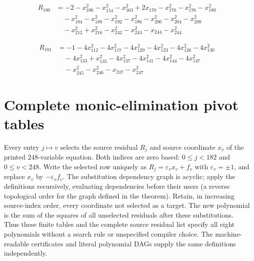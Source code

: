 \documentclass[11pt,letterpaper]{article}
\theoremstyle{definition}
\theoremstyle{remark}
\begin{document}
\begin{align*}
R_{180} &= -2 -x_{106}^{2} -x_{154}^{2} -x_{163}^{2} +2 x_{170} -x_{170}^{2} -x_{176}^{2} -x_{180}^{2} \\
&\quad -x_{184}^{2} -x_{188}^{2} -x_{192}^{2} -x_{196}^{2} -x_{200}^{2} -x_{204}^{2} -x_{208}^{2} \\
&\quad -x_{212}^{2} +x_{216}^{2} -x_{242}^{2} -x_{243}^{2} -x_{244} -x_{244}^{2}
\end{align*}

\begin{align*}
R_{181} &= -1 -4 x_{112}^{2} -4 x_{117}^{2} -4 x_{120}^{2} -4 x_{123}^{2} -4 x_{126}^{2} -4 x_{130}^{2} \\
&\quad -4 x_{133}^{2} +x_{135}^{2} -4 x_{137}^{2} -4 x_{141}^{2} -4 x_{144}^{2} -4 x_{147}^{2} \\
&\quad -x_{245}^{2} -x_{246}^{2} -x_{247} -x_{247}^{2}
\end{align*}

\endgroup

\clearpage
\begingroup
\setlength{\LTpre}{4pt}
\setlength{\LTpost}{6pt}
\section{Complete monic-elimination pivot tables}
\label{app:monic-pivots}

Every entry $j\mapsto v$ selects the source residual $R_j$ and source
coordinate $x_v$ of the printed $248$-variable equation.  Both indices are
zero based: $0\le j<182$ and $0\le v<248$.  Write the selected row uniquely
as $R_j=\varepsilon_vx_v+f_v$ with $\varepsilon_v=\pm1$, and replace
$x_v$ by $-\varepsilon_vf_v$.  The substitution dependency graph is acyclic;
apply the definitions recursively, evaluating dependencies before their
users (a reverse topological order for the graph defined in the theorem). Retain, in
increasing source-index order, every coordinate not selected as a target.
The new polynomial is the sum of the squares of all unselected residuals
after these substitutions.  Thus these finite tables and the complete
source residual list specify all eight polynomials without a search rule
or unspecified compiler choice.  The machine-readable certificates and
literal polynomial DAGs supply the same definitions independently.
\end{document}
